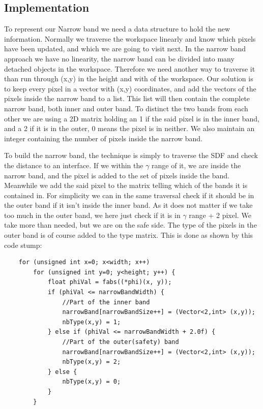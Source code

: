 \subsection{Implementation}
To represent our Narrow band we need a data structure to hold the new
information. Normally we traverse the workspace linearly and know
which pixels have been updated, and which we are going to visit
next. In the narrow band approach we have no linearity, the narrow
band can be divided into many detached objects in the
workspace. Therefore we need another way to traverse it than run
through (x,y) in the height and with of the workspace. Our solution is
to keep every pixel in a vector with (x,y) coordinates, and add the
vectors of the pixels inside the narrow band to a list. This list will
then contain the complete narrow band, both inner and outer band. To
distinct the two bands from each other we are using a 2D matrix
holding an 1 if the said pixel is in the inner band, and a 2 if it is
in the outer, 0 means the pixel is in neither. We also maintain an
integer containing the number of pixels inside the narrow band.

To build the narrow band, the technique is simply to traverse the SDF
and check the distance to an interface. If we within the $\gamma$
range of it, we are inside the narrow band, and the pixel is added to
the set of pixels inside the band. Meanwhile we add the said pixel to
the matrix telling which of the bands it is contained in. For
simplicity we can in the same traversal check if it should be in the
outer band if it isn't inside the inner band. As it does not matter if
we take too much in the outer band, we here just check if it is in
$\gamma$ range + 2 pixel. We take more than needed, but we are on the
safe side. The type of the pixels in the outer band is of course added
to the type matrix. This is done as shown by this code stump:

\begin{lstlisting}
    for (unsigned int x=0; x<width; x++)
        for (unsigned int y=0; y<height; y++) {
            float phiVal = fabs((*phi)(x, y));
            if (phiVal <= narrowBandWidth) {
                //Part of the inner band
                narrowBand[narrowBandSize++] = (Vector<2,int> (x,y));
                nbType(x,y) = 1;
            } else if (phiVal <= narrowBandWidth + 2.0f) {
                //Part of the outer(safety) band
                narrowBand[narrowBandSize++] = (Vector<2,int> (x,y));
                nbType(x,y) = 2;
            } else {
                nbType(x,y) = 0;
            }
        }
\end{lstlisting}


